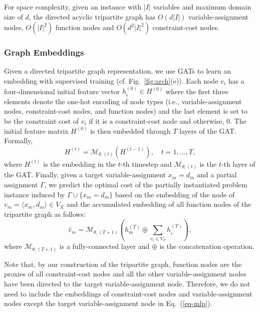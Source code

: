 \documentclass[letterpaper]{article} %
\begin{document}
For space complexity, given an instance with $|I|$ variables and maximum domain size of $d$, the directed acyclic tripartite graph has $O(d|I|)$ variable-assignment nodes, $O(|I|^2)$ function nodes and $O(d^2|I|^2)$ constraint-cost nodes.

\subsubsection{Graph Embeddings}
Given a directed tripartite graph representation, we use GATs to learn an embedding with supervised training (cf. Fig.~\ref{fig:arch}(e)). Each node $v_i$ has a four-dimensional initial feature vector $h^{(0)}_i\in H^{(0)}$ where the first three elements denote the one-hot encoding of node types (i.e., variable-assignment nodes, constraint-cost nodes, and function nodes) and the last element is set to be the constraint cost of $v_i$ if it is a constraint-cost node and otherwise, $0$. The initial feature matrix $H^{(0)}$ is then embedded through $T$ layers of the GAT. Formally,
\begin{equation}
    H^{(t)} = \mathcal{M}_{\theta,(t)}(H^{(t-1)}),\quad t=1,\dots,T,\label{eq-embed}
\end{equation}
where $H^{(t)}$ is the embedding in the $t$-th timestep and $\mathcal{M}_{\theta,(t)}$ is the $t$-th layer of the GAT. Finally, given a target variable-assignment $x_m=d_m$ and a partial assignment $\Gamma$, we predict the optimal cost of the partially instantiated problem instance induced by $\Gamma\cup\{ x_m=d_m\}$ based on the embedding of the node of $v_m=\langle x_m, d_m\rangle\in V_X$ and the accumulated embedding of all function nodes of the tripartite graph as follows:
\begin{equation}
    \hat{c}_m=\mathcal{M}_{\theta, (T+1)}(h_m^{(T)}\oplus \sum_{v_i\in V_F}h_i^{(T)}), \label{eq-mlp}
\end{equation}
where $\mathcal{M}_{\theta, (T+1)}$ is a fully-connected layer and $\oplus$ is the concatenation operation.

Note that, by our construction of the tripartite graph, function nodes are the proxies of all constraint-cost nodes and all the other variable-assignment nodes have been directed to the target variable-assignment node. Therefore, we do not need to include the embeddings of constraint-cost nodes and variable-assignment nodes except the target variable-assignment node in Eq.~(\ref{eq-mlp}).
\end{document}
